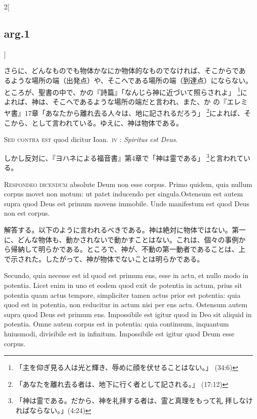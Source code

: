 \documentclass[paper=a4paper,fontsize=10pt,jafontsize=9pt,titlepage]{jlreq}
\begin{document}
\begin{paracol}{2}[\subsection{arg.1}]
\switchcolumn

さらに、どんなものでも物体かなにか物体的なものでなければ、そこからであ
るような場所の端（出発点）や、そこへである場所の端（到達点）にならない。
ところが、聖書の中で、かの『詩篇』「なんじら神に近づいて照らされよ」
\footnote{「主を仰ぎ見る人は光と輝き、辱めに顔を伏せることはない。」
(34:6)}によれば、神は、そこへであるような場所の端だと言われ、また、か
の『エレミヤ書』17章「あなたから離れ去る人々は、地に記されるだろう」
\footnote{「あなたを離れ去る者は、地下に行く者として記される。」
(17:12)}によれば、そこから、として言われている。ゆえに、神は物体である。

\switchcolumn*[\subsection{s.c.}]

{\scshape Sed contra est} quod dicitur Ioan.~{\scshape iv} : {\itshape Spiritus est Deus}.

\switchcolumn

しかし反対に、『ヨハネによる福音書』第4章で「神は霊である」
\footnote{「神は霊である。だから、神を礼拝する者は、霊と真理をもって礼
拝しなければならない。」(4:24)}と言われている。


{\scshape Respondeo dicendum} absolute Deum non esse corpus.  Primo quidem,
quia nullum corpus movet non motum: ut patet inducendo per
singula.Ostensum est autem supra quod Deus est primum movens immobile.
Unde manifestum est quod Deus non est corpus.

\switchcolumn

解答する。以下のように言われるべきである。神は絶対に物体ではない。第一
に、どんな物体も、動かされないで動かすことはない。これは、個々の事例か
ら帰納して明らかである。ところで、神が、不動の第一動者であることは、上
で示された。したがって、神が物体でないことは明らかである。

\switchcolumn*

Secundo, quia necesse est id quod est primum ens, esse in actu, et
nullo modo in potentia.  Licet enim in uno et eodem quod exit de
potentia in actum, prius sit potentia quam actus tempore, simpliciter
tamen actus prior est potentia: quia quod est in potentia, non
reducitur in actum nisi per ens actu.  Ostensum autem supra quod Deus
est primum ens.  Impossibile est igitur quod in Deo sit aliquid in
potentia.  Omne autem corpus est in potentia: quia continuum,
inquantum huiusmodi, divisibile est in infinitum.  Impossibile est
igitur quod Deum esse corpus.


\end{paracol}
\end{document}
